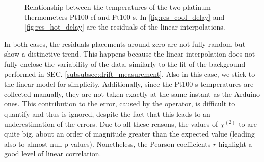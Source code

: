 \documentclass[rmp,10pt,onecolumn,fleqn,notitlepage]{revtex4-1}
\begin{document}
\begin{figure}[h!]
\begin{minipage}[]{0.49\linewidth}
\centering
{}
\end{minipage}
\label{fig:delay_evaluation}
\caption{Relationship between the temperatures of the two platinum thermometers Pt100-cf and Pt100-s. In \ref{fig:res_cool_delay} and \ref{fig:res_hot_delay} are the residuals of the linear interpolations.}
\end{figure}

\pagebreak 

In both cases, the residuals placements around zero are not fully random but show a distinctive trend. This happens because the linear interpolation does not fully enclose the variability of the data, similarly to the fit of the background performed in SEC. \ref{subsubsec:drift_measurement}. Also in this case, we stick to the linear model for simplicity. Additionally, since the Pt100-s temperatures are collected manually, they are not taken exactly at the same instant as the Arduino ones. This contribution to the error, caused by the operator, is difficult to quantify and thus is ignored, despite the fact that this leads to an underestimation of the errors. Due to all these reasons, the values of $\chi^{(2)}$ to are quite big, about an order of magnitude greater than the expected value (leading also to almost null p-values). Nonetheless, the Pearson coefficients $r$ highlight a good level of linear correlation.
\end{document}
